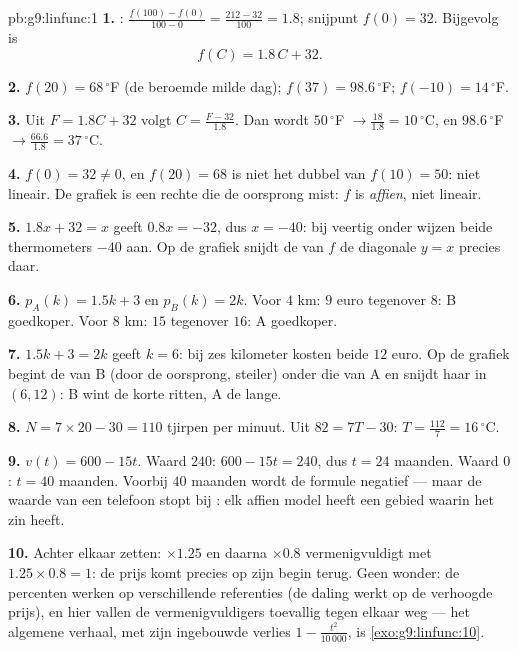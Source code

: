 \begin{solution}{pb:g9:linfunc:1}
\textbf{1.} : $\frac{f(100) - f(0)}{100 - 0} =
\frac{212 - 32}{100} = 1.8$; snijpunt $f(0) = 32$. Bijgevolg is
\[
f(C) = 1.8\,C + 32 .
\]

\textbf{2.} $f(20) = 68\,^\circ$F (de beroemde milde dag);
$f(37) = 98.6\,^\circ$F; $f(-10) = 14\,^\circ$F.

\textbf{3.} Uit $F = 1.8C + 32$ volgt $C = \frac{F - 32}{1.8}$. Dan wordt
$50\,^\circ$F $\to \frac{18}{1.8} = 10\,^\circ$C, en $98.6\,^\circ$F
$\to \frac{66.6}{1.8} = 37\,^\circ$C.

\textbf{4.} $f(0) = 32 \neq 0$, en $f(20) = 68$ is niet het dubbel van
$f(10) = 50$: niet lineair. De grafiek is een rechte  die de oorsprong mist:
$f$ is \emph{affien}, niet lineair.

\textbf{5.} $1.8x + 32 = x$ geeft $0.8x = -32$, dus $x = -40$: bij veertig onder
 wijzen beide thermometers $-40$ aan. Op de grafiek snijdt de  van $f$ de
diagonale  $y = x$ precies daar.

\textbf{6.} $p_A(k) = 1.5k + 3$ en $p_B(k) = 2k$. Voor $4$ km: $9$ euro tegenover
$8$: B goedkoper. Voor $8$ km: $15$ tegenover $16$: A goedkoper.

\textbf{7.} $1.5k + 3 = 2k$ geeft $k = 6$: bij zes kilometer kosten beide $12$
euro. Op de grafiek begint de  van B (door de oorsprong, steiler) onder die van
A en snijdt haar in $(6, 12)$: B wint de korte ritten, A de lange.

\textbf{8.} $N = 7 \times 20 - 30 = 110$ tjirpen per minuut. Uit $82 = 7T - 30$:
$T = \frac{112}{7} = 16\,^\circ$C.

\textbf{9.} $v(t) = 600 - 15t$. Waard $240$: $600 - 15t = 240$, dus $t = 24$
maanden. Waard $0$: $t = 40$ maanden. Voorbij $40$ maanden wordt de formule
negatief --- maar de waarde van een telefoon stopt bij : elk affien model heeft
een gebied waarin het zin heeft.

\textbf{10.} Achter elkaar zetten: $\times 1.25$ en daarna $\times 0.8$
vermenigvuldigt met $1.25 \times 0.8 = 1$: de prijs komt precies op zijn begin
terug. Geen wonder: de percenten werken op verschillende referenties (de daling
werkt op de verhoogde prijs), en hier vallen de vermenigvuldigers toevallig tegen
elkaar weg --- het algemene verhaal, met zijn ingebouwde verlies
$1 - \frac{t^2}{10\,000}$, is \cref{exo:g9:linfunc:10}.


\end{solution}
